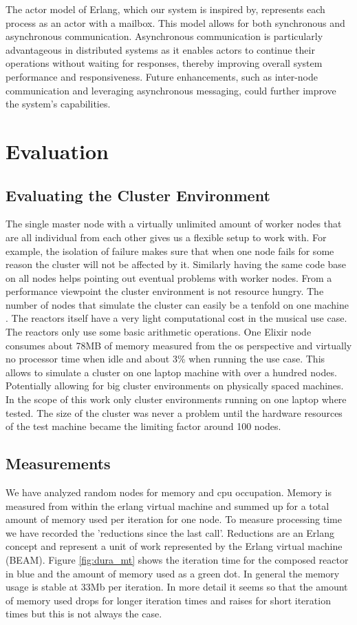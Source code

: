 \documentclass[a4paper]{book}
\begin{document}
The actor model of Erlang, which our system is inspired by, represents each process as an actor with a mailbox. This model allows for both synchronous and asynchronous communication. Asynchronous communication is particularly advantageous in distributed systems as it enables actors to continue their operations without waiting for responses, thereby improving overall system performance and responsiveness. Future enhancements, such as inter-node communication and leveraging asynchronous messaging, could further improve the system's capabilities.

\chapter{Evaluation} \label{sec:evaluation}


\section{Evaluating the Cluster Environment}

The single master node with a virtually unlimited amount of worker nodes that are all individual from each other gives us a flexible setup to work with. For example, the isolation of failure makes sure that when one node fails for some reason the cluster will not be affected by it. Similarly having the same code base on all nodes helps pointing out eventual problems with worker nodes. From a performance viewpoint the cluster environment is not resource hungry. The number of nodes that simulate the cluster can easily be a tenfold on one machine . The reactors itself have a very light computational cost in the musical use case. The reactors only use some basic arithmetic operations. One Elixir node consumes about 78MB of memory measured from the os perspective and virtually no processor time when idle and about 3\% when running the use case. This allows to simulate a cluster on one laptop machine with over a hundred nodes. Potentially allowing for big cluster environments on physically spaced machines. In the scope of this work only cluster environments running on one laptop where tested. The size of the cluster was never a problem until the hardware resources of the test machine became the limiting factor around 100 nodes.

\section{Measurements}
We have analyzed random nodes for memory and cpu occupation. Memory is measured from within the erlang virtual machine and summed up for a total amount of memory used per iteration for one node. To measure processing time we have recorded the 'reductions since the last call'. Reductions are an Erlang concept and represent a unit of work represented by the Erlang virtual machine (BEAM). Figure \ref{fig:dura_mt} shows the iteration time for the composed reactor in blue and the amount of memory used as a green dot. In general the memory usage is stable at 33Mb per iteration. In more detail it seems so that the amount of memory used drops for longer iteration times and raises for short iteration times but this is not always the case.
\end{document}
